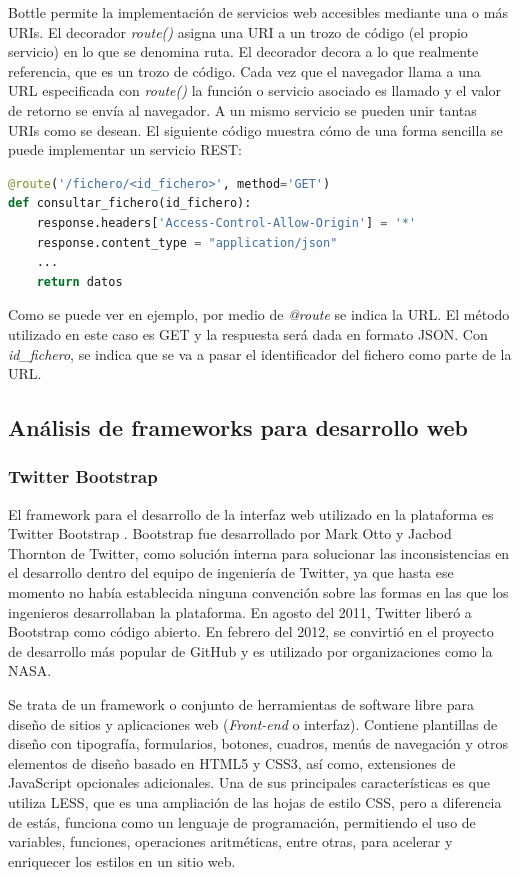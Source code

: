 Bottle permite la implementación de servicios web accesibles mediante una o más URIs. El decorador \textit{route()} asigna una URI a un trozo de código (el propio servicio) en lo que se denomina ruta. El decorador decora a lo que realmente referencia, que es un trozo de código. Cada vez que el navegador llama a una URL especificada con \textit{route()} la función o servicio asociado es llamado y el valor de retorno se envía al navegador. A un mismo servicio se pueden unir tantas URIs como se desean. El siguiente código muestra cómo de una forma sencilla se puede implementar un servicio REST:
\begin{lstlisting}[language=python]
@route('/fichero/<id_fichero>', method='GET')
def consultar_fichero(id_fichero):
    response.headers['Access-Control-Allow-Origin'] = '*'
    response.content_type = "application/json"
    ...
    return datos
\end{lstlisting}
Como se puede ver en ejemplo, por medio de \textit{@route} se indica la URL. El método utilizado en este caso es GET y la respuesta será dada en formato JSON. Con \textit{id\_fichero}, se indica que se va a pasar el identificador del fichero como parte de la URL.

\subsection{Análisis de frameworks para desarrollo web}

\subsubsection{\textbf{Twitter Bootstrap}}
El framework para el desarrollo de la interfaz web utilizado en la plataforma es Twitter Bootstrap \cite{bootstrap}. Bootstrap fue desarrollado por Mark Otto y Jacbod Thornton de Twitter, como solución interna para solucionar las inconsistencias en el desarrollo dentro del equipo de ingeniería de Twitter, ya que hasta ese momento no había establecida ninguna convención sobre las formas en las que los ingenieros desarrollaban la plataforma. En agosto del 2011, Twitter liberó a Bootstrap como código abierto. En febrero del 2012, se convirtió en el proyecto de desarrollo más popular de GitHub \cite{github} y es utilizado por organizaciones como la NASA.

Se trata de un framework o conjunto de herramientas de software libre para diseño de sitios y aplicaciones web (\textit{Front-end} o interfaz). Contiene plantillas de diseño con tipografía, formularios, botones, cuadros, menús de navegación y otros elementos de diseño basado en HTML5 y CSS3, así como, extensiones de JavaScript opcionales adicionales. Una de sus principales características es que utiliza LESS, que es una ampliación de las hojas de estilo CSS, pero a diferencia de estás, funciona como un lenguaje de programación, permitiendo el uso de variables, funciones, operaciones aritméticas, entre otras, para acelerar y enriquecer los estilos en un sitio web.

